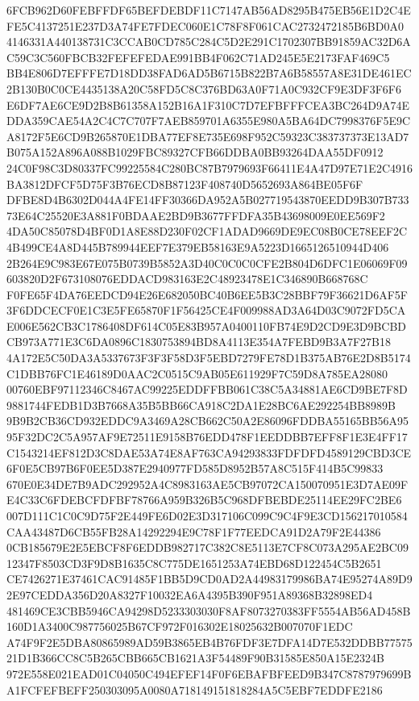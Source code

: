 \documentclass[UTF8,fontset=fandol,zihao=-4,a4paper]{ctexart}
\begin{document}
{{6FCB962D60FEBFFDF65BEFDEBDF11C7147AB56AD8295B475EB56E1D2C4EFE5C4137251E237D3A74FE7FDEC060E1C78F8F061CAC2732472185B6BD0A0
4146331A440138731C3CCAB0CD785C284C5D2E291C1702307BB91859AC32D6AC59C3C560FBCB32FEFEFEDAE991BB4F062C71AD245E5E2173FAF469C5
BB4E806D7EFFFE7D18DD38FAD6AD5B6715B822B7A6B58557A8E31DE461EC2B130B0C0CE4435138A20C58FD5C8C376BD63A0F71A0C932CF9E3DF3F6F6
E6DF7AE6CE9D2B8B61358A152B16A1F310C7D7EFBFFFCEA3BC264D9A74EDDA359CAE54A2C4C7C707F7AEB859701A6355E980A5BA64DC7998376F5E9C
A8172F5E6CD9B265870E1DBA77EF8E735E698F952C59323C383737373E13AD7B075A152A896A088B1029FBC89327CFB66DDBA0BB93264DAA55DF0912
24C0F98C3D80337FC99225584C280BC87B7979693F66411E4A47D97E71E2C4916BA3812DFCF5D75F3B76ECD8B87123F408740D5652693A864BE05F6F
DFBE8D4B6302D044A4FE14FF30366DA952A5B027719543870EEDD9B307B73373E64C25520E3A881F0BDAAE2BD9B3677FFDFA35B43698009E0EE569F2
4DA50C85078D4BF0D1A8E88D230F02CF1ADAD9669DE9EC08B0CE78EEF2C4B499CE4A8D445B789944EEF7E379EB58163E9A5223D1665126510944D406
2B264E9C983E67E075B0739B5852A3D40C0C0C0CFE2B804D6DFC1E06069F09603820D2F673108076EDDACD983163E2C48923478E1C346890B668768C
F0FE65F4DA76EEDCD94E26E682050BC40B6EE5B3C28BBF79F36621D6AF5F3F6DDCECF0E1C3E5FE65870F1F56425CE4F009988AD3A64D03C9072FD5CA
E006E562CB3C1786408DF614C05E83B957A0400110FB74E9D2CD9E3D9BCBDCB973A771E3C6DA0896C1830753894BD8A4113E354A7FEBD9B3A7F27B18
4A172E5C50DA3A5337673F3F3F58D3F5EBD7279FE78D1B375AB76E2D8B5174C1DBB76FC1E46189D0AAC2C0515C9AB05E611929F7C59D8A785EA28080
00760EBF97112346C8467AC99225EDDFFBB061C38C5A34881AE6CD9BE7F8D9881744FEDB1D3B7668A35B5BB66CA918C2DA1E28BC6AE292254BB8989B
9B9B2CB36CD932EDDC9A3469A28CB662C50A2E86096FDDBA55165BB56A9595F32DC2C5A957AF9E72511E9158B76EDD478F1EEDDBB7EFF8F1E3E4FF17
C1543214EF812D3C8DAE53A74E8AF763CA94293833FDFDFD4589129CBD3CE6F0E5CB97B6F0EE5D387E2940977FD585D8952B57A8C515F414B5C99833
670E0E34DE7B9ADC292952A4C8983163AE5CB97072CA150070951E3D7AE09FE4C33C6FDEBCFDFBF78766A959B326B5C968DFBEBDE25114EE29FC2BE6
007D111C1C0C9D75F2E449FE6D02E3D317106C099C9C4F9E3CD156217010584CAA43487D6CB55FB28A14292294E9C78F1F77EEDCA91D2A79F2E44386
0CB185679E2E5EBCF8F6EDDB982717C382C8E5113E7CF8C073A295AE2BC0912347F8503CD3F9D8B1635C8C775DE1651253A74EBD68D122454C5B2651
CE7426271E37461CAC91485F1BB5D9CD0AD2A44983179986BA74E95274A89D92E97CEDDA356D20A8327F10032EA6A4395B390F951A89368B32898ED4
481469CE3CBB5946CA94298D5233303030F8AF8073270383FF5554AB56AD458B160D1A3400C987756025B67CF972F016302E18025632B007070F1EDC
A74F9F2E5DBA80865989AD59B3865EB4B76FDF3E7DFA14D7E532DDBB7757521D1B366CC8C5B265CBB665CB1621A3F54489F90B31585E850A15E2324B
972E558E021EAD01C04050C494EFEF14F0F6EBAFBFEED9B347C8787979699BA1FCFEFBEFF250303095A0080A718149151818284A5C5EBF7EDDFE2186
}}
\end{document}
